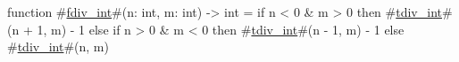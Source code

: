function #\hyperref[sailRISCVzfdivzyint]{fdiv\_int}#(n: int, m: int) -> int = {
  if n < 0 & m > 0 then {
    #\hyperref[sailRISCVztdivzyint]{tdiv\_int}#(n + 1, m) - 1
  } else if n > 0 & m < 0 then {
    #\hyperref[sailRISCVztdivzyint]{tdiv\_int}#(n - 1, m) - 1
  } else {
    #\hyperref[sailRISCVztdivzyint]{tdiv\_int}#(n, m)
  }
}
